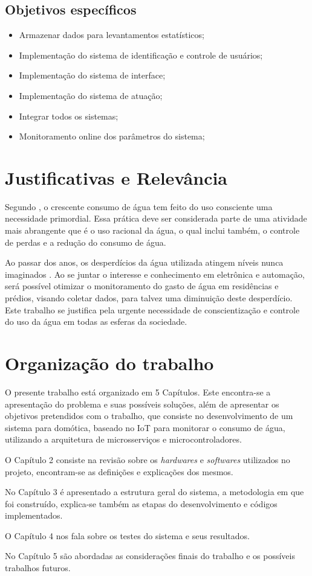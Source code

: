\subsection{Objetivos específicos}

\begin{itemize}
	\item Armazenar dados para levantamentos estatísticos;
	\item Implementação do sistema de identificação e controle de usuários;
	\item Implementação do sistema de interface;
	\item Implementação do sistema de atuação;
	\item Integrar todos os sistemas;
	\item Monitoramento online dos parâmetros do sistema;
\end{itemize}

\section{Justificativas e Relev{\^a}ncia}
%
Segundo \cite{AlvesDaSilva}, o crescente consumo de água
tem feito do uso consciente uma necessidade primordial. Essa prática deve ser considerada parte de uma atividade mais abrangente que é o uso racional da água, o qual inclui também, o controle de perdas e a redução do consumo de água.

Ao passar dos anos, os desperdícios da água utilizada atingem níveis nunca imaginados \cite{rebouccas2003agua}. Ao se juntar o interesse e conhecimento em eletrônica e automação, será possível otimizar o monitoramento do gasto de água em residências e prédios, visando coletar dados, para talvez uma diminuição deste desperdício. Este trabalho se justifica pela urgente necessidade de conscientização e controle do uso da água em todas as esferas da sociedade. 
%
\section{Organização do trabalho}

O presente trabalho está organizado em 5 Capítulos. Este encontra-se a apresentação do problema e suas possíveis soluções, além de apresentar os objetivos pretendidos com o trabalho, que consiste no desenvolvimento de um sistema para domótica, baseado no IoT para monitorar o consumo de água, utilizando a arquitetura de microsserviços e microcontroladores.

O Capítulo 2 consiste na revisão sobre os \textit{hardwares} e \textit{softwares} utilizados no projeto, encontram-se as definições e explicações dos mesmos.

No Capítulo 3 é apresentado a estrutura geral do sistema, a metodologia em que foi construído, explica-se também as etapas do desenvolvimento e códigos implementados.

O Capítulo 4 nos fala sobre os testes do sistema e seus resultados.

No Capítulo 5 são abordadas as considerações finais do trabalho e os possíveis trabalhos futuros.